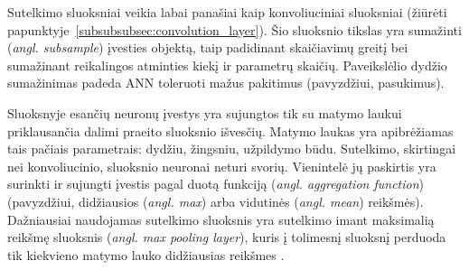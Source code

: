 \documentclass{VUMIFPSbakalaurinis}
\begin{document}
{
	Sutelkimo sluoksniai veikia labai panašiai kaip konvoliuciniai sluoksniai (žiūrėti papunktyje~\ref{subsubsubsec:convolution_layer}). Šio sluoksnio tikslas yra sumažinti (\textit{angl. subsample}) įvesties objektą, taip padidinant skaičiavimų greitį bei sumažinant reikalingos atminties kiekį ir parametrų skaičių. Paveikslėlio dydžio sumažinimas padeda ANN toleruoti mažus pakitimus (pavyzdžiui, pasukimus).\par
	
	Sluoksnyje esančių neuronų įvestys  yra sujungtos tik su matymo laukui priklausančia dalimi praeito sluoksnio išvesčių. Matymo laukas yra apibrėžiamas tais pačiais parametrais: dydžiu, žingsniu, užpildymo būdu. Sutelkimo, skirtingai nei konvoliucinio, sluoksnio neuronai neturi svorių. Vienintelė jų paskirtis yra surinkti ir sujungti įvestis pagal duotą funkciją (\textit{angl. aggregation function}) (pavyzdžiui, didžiausios (\textit{angl. max}) arba vidutinės (\textit{angl. mean}) reikšmės). Dažniausiai naudojamas sutelkimo sluoksnis yra sutelkimo imant maksimalią reikšmę sluoksnis (\textit{angl. max pooling layer}), kuris į tolimesnį sluoksnį perduoda tik kiekvieno matymo lauko didžiausias reikšmes \cite{handson}.\par
}
\end{document}
